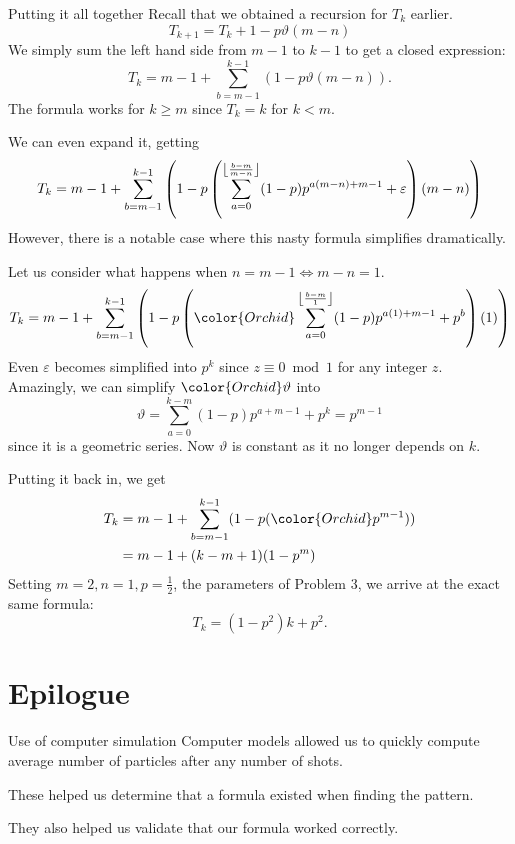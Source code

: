 \documentclass[xcolor={usenames,dvipsnames}]{beamer}
\DeclarePairedDelimiter\floor{\lfloor}{\rfloor}
\begin{document}
\begin{frame}{Putting it all together}
  Recall that we obtained a recursion for  $T_k$ earlier.
  \[T_{k+1} = T_k + 1 - p\vartheta(m - n)\]
  We simply sum the left hand side from $m-1$ to $k-1$ to get a closed expression:
  \begin{equation*}
  T_k = m-1 + \sum_{b=m-1}^{k-1} \left(1-p\vartheta(m-n)\right).
  \end{equation*}
  The formula works for $k \ge m$ since $T_k = k$ for  $k<m$.
\end{frame}

\begin{frame}
  We can even expand it, getting
  \[
  T_k = m-1+\sum _{b=m-1}^{k-1} \left(1-p \left(\sum _{a=0}^{\floor*{\frac{b-m}{m-n}} } (1-p) p^{a (m-n)+m-1}+\varepsilon\right) (m-n)\right)
  \] However, there is a notable case where this nasty formula simplifies dramatically.
\end{frame}

\begin{frame}
  Let us consider what happens when $n = m-1 \iff m-n = 1$.
  \begin{equation*}
    T_k = m-1+\sum _{b=m-1}^{k-1} \left(1-p \left({\color{Orchid}\sum _{a=0}^{\floor*{\frac{b-m}{1}} } (1-p) p^{a (1)+m-1}+p^{b}}\right) (1)\right)
  \end{equation*}
  Even $\varepsilon$ becomes simplified into $p^{k}$ since $z \equiv 0 \bmod 1$ for any integer  $z$. Amazingly, we can simplify $\color{Orchid} \vartheta$ into  \[
    \vartheta = \sum _{a=0}^{k-m } (1-p) p^{a+m-1}+p^{k} = p^{m-1}
  \] since it is a geometric series. Now $\vartheta$ is constant as it no longer depends on  $k$.
\end{frame}
\begin{frame}
  Putting it back in, we get 
    \begin{align*}
      T_k &= m-1 + \sum_{b=m-1}^{k-1} (1-p({\color{Orchid} p^{m-1}})) \\
          &= m-1 + (k-m+1)(1-p^{m})
    \end{align*}
    Setting $m = 2, n = 1, p = \frac{1}{2}$, the parameters of Problem 3, we arrive at the exact same formula: \[
      T_k = (1 - p^2)k + p^2
    .\] 
\end{frame}

\section{Epilogue}
\begin{frame}{Use of computer simulation}
  Computer models allowed us to quickly compute average number of particles after any number of shots.

  These helped us determine that a formula existed when finding the pattern.

  They also helped us validate that our formula worked correctly.
\end{frame}
\end{document}
